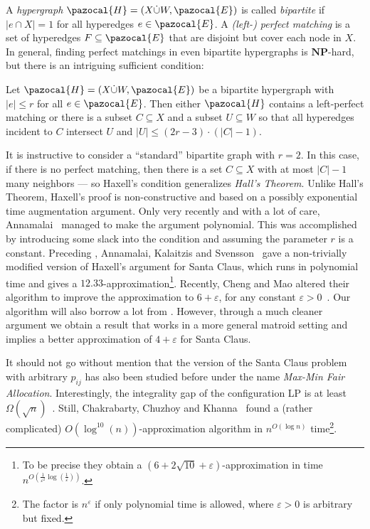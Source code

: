 A \emph{hypergraph} $\pazocal{H} = (X \dot{\cup} W,\pazocal{E})$ is called \emph{bipartite}
if $|e \cap X| = 1$ for all hyperedges $e \in \pazocal{E}$. A \emph{(left-) perfect matching} is a set of hyperedges $F \subseteq \pazocal{E}$ that are disjoint but cover each node in $X$. In general, finding perfect matchings in even bipartite hypergraphs is 
$\mathbf{NP}$-hard, but there is an intriguing sufficient condition: 
\begin{theorem}
Let $\pazocal{H} = (X \dot{\cup} W,\pazocal{E})$ be a bipartite hypergraph with $|e| \leq r$ for all $e \in \pazocal{E}$. Then either $\pazocal{H}$
contains a left-perfect matching or there is a subset $C \subseteq X$ and a subset $U \subseteq W$
so that all hyperedges incident to $C$ intersect $U$ and $|U| \leq (2r-3) \cdot (|C|-1)$.
\end{theorem}
It is instructive to consider a ``standard'' bipartite graph with $r=2$.
In this case, if there is no perfect matching, then there is a set $C \subseteq X$ with at most 
$|C|-1$ many neighbors --- so Haxell's condition generalizes \emph{Hall's Theorem}. Unlike Hall's Theorem, 
Haxell's proof is non-constructive and based on a possibly exponential time augmentation argument.
Only very recently and with a lot of care, Annamalai~\cite{FindingPerfectMatchingsInHypergraphs-Annamalai-SODA16} managed to make the argument polynomial. This was accomplished by introducing some slack into the condition and assuming the parameter $r$ is a constant. Preceding \cite{FindingPerfectMatchingsInHypergraphs-Annamalai-SODA16}, 
Annamalai, Kalaitzis and Svensson~\cite{AlgoForSantaClaus-AnnamalaiKalaitzisSvenssonSODA15}
gave a non-trivially modified version of Haxell's argument for Santa Claus, which runs in polynomial time
and gives a $12.33$-approximation\footnote{To be precise they obtain a $(6+2\sqrt{10}+\varepsilon)$-approximation in time $n^{O(\frac{1}{\varepsilon^2}\log(\frac{1}{\varepsilon}))}$.}.
Recently, Cheng and Mao altered their algorithm to improve the approximation to 
$6 + \varepsilon$, for any constant $\varepsilon >0$~\cite{ChengM18}.
Our algorithm will also borrow a lot from \cite{AlgoForSantaClaus-AnnamalaiKalaitzisSvenssonSODA15}. 
However, through a much cleaner argument
we obtain a result that works in a more general matroid setting
and implies a better approximation of $4+\varepsilon$ for Santa Claus.


It should not go without mention that the version of the Santa Claus problem with arbitrary 
$p_{ij}$ has also been studied before under the name \emph{Max-Min Fair Allocation}. Interestingly, the integrality gap of the 
configuration LP is at least $\Omega(\sqrt{n})$~\cite{SantaClaus-BansalSviridenko-STOC2006}. 
Still, Chakrabarty, Chuzhoy and Khanna~\cite{MaxMinFairAllocation-ChakrabartyChuzhoyKhannaFOCS09}
found a (rather complicated) $O(\log^{10}(n))$-approximation algorithm in  $n^{O(\log n)}$ time\footnote{The
factor is $n^{\varepsilon}$ if only polynomial time is allowed, where $\varepsilon > 0$ is arbitrary but fixed.}.

